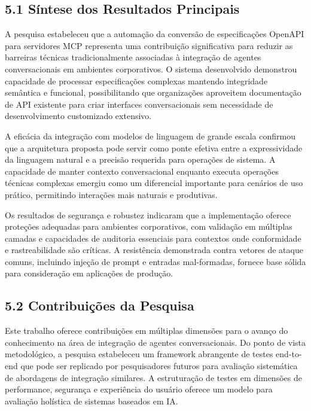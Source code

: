 \documentclass[
]{article}
\begin{document}
\subsection{5.1 Síntese dos Resultados
Principais}\label{suxedntese-dos-resultados-principais}

A pesquisa estabeleceu que a automação da conversão de especificações
OpenAPI para servidores MCP representa uma contribuição significativa
para reduzir as barreiras técnicas tradicionalmente associadas à
integração de agentes conversacionais em ambientes corporativos. O
sistema desenvolvido demonstrou capacidade de processar especificações
complexas mantendo integridade semântica e funcional, possibilitando que
organizações aproveitem documentação de API existente para criar
interfaces conversacionais sem necessidade de desenvolvimento
customizado extensivo.

A eficácia da integração com modelos de linguagem de grande escala
confirmou que a arquitetura proposta pode servir como ponte efetiva
entre a expressividade da linguagem natural e a precisão requerida para
operações de sistema. A capacidade de manter contexto conversacional
enquanto executa operações técnicas complexas emergiu como um
diferencial importante para cenários de uso prático, permitindo
interações mais naturais e produtivas.

Os resultados de segurança e robustez indicaram que a implementação
oferece proteções adequadas para ambientes corporativos, com validação
em múltiplas camadas e capacidades de auditoria essenciais para
contextos onde conformidade e rastreabilidade são críticas. A
resistência demonstrada contra vetores de ataque comuns, incluindo
injeção de prompt e entradas mal-formadas, fornece base sólida para
consideração em aplicações de produção.

\subsection{5.2 Contribuições da
Pesquisa}\label{contribuiuxe7uxf5es-da-pesquisa}

Este trabalho oferece contribuições em múltiplas dimensões para o avanço
do conhecimento na área de integração de agentes conversacionais. Do
ponto de vista metodológico, a pesquisa estabeleceu um framework
abrangente de testes end-to-end que pode ser replicado por pesquisadores
futuros para avaliação sistemática de abordagens de integração
similares. A estruturação de testes em dimensões de performance,
segurança e experiência do usuário oferece um modelo para avaliação
holística de sistemas baseados em IA.
\end{document}
